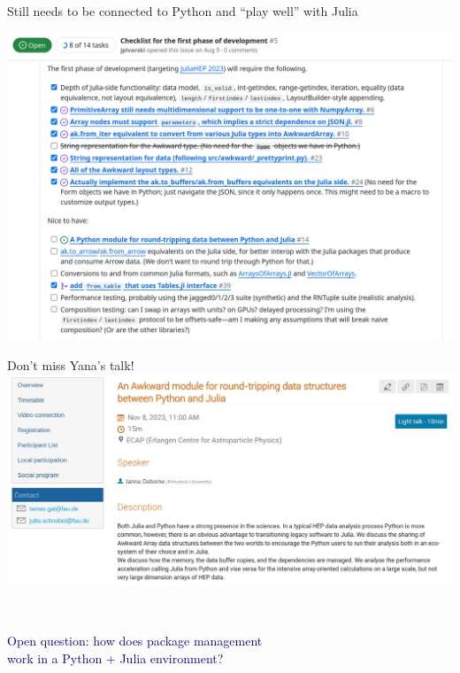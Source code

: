 \documentclass[aspectratio=169]{beamer}
\begin{document}
\begin{frame}{Still needs to be connected to Python and ``play well'' with Julia}
\vspace{0.1 cm}
\begin{center}
\includegraphics[width=0.82\linewidth]{issue-5.png}
\end{center}
\end{frame}

\begin{frame}{Don't miss Yana's talk!}
\vspace{0.5 cm}
\includegraphics[width=\linewidth]{ianna-lightning-talk.png}
\end{frame}

\begin{frame}{\mbox{ }}
\vspace{0.5 cm}
\LARGE
\begin{center}
\textcolor{darkblue}{Open question: how does package management \\ work in a Python + Julia environment?}
\end{center}

\vspace{1 cm}
\begin{center}
\end{center}
\end{frame}
\end{document}
